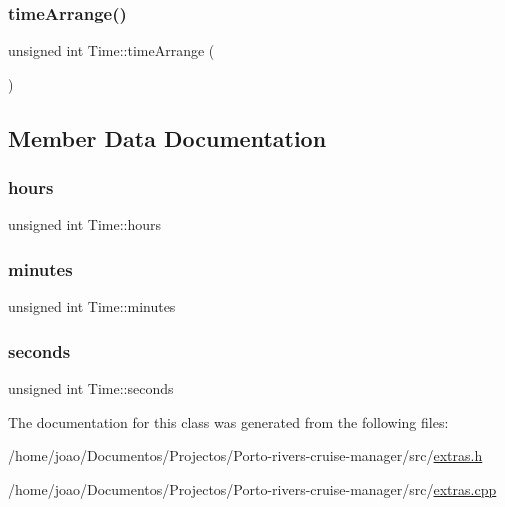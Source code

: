 \mbox{\label{classTime_a9cbc26fef4650c18e4f0c5ee695c006c}} 
\subsubsection{\texorpdfstring{time\+Arrange()}{timeArrange()}}
{\footnotesize\ttfamily unsigned int Time\+::time\+Arrange (\begin{DoxyParamCaption}{ }\end{DoxyParamCaption})\hspace{0.3cm}{\ttfamily [private]}}



\subsection{Member Data Documentation}
\mbox{\label{classTime_a08e7d6202b1fe8c01c25bf6688d41712}} 
\subsubsection{\texorpdfstring{hours}{hours}}
{\footnotesize\ttfamily unsigned int Time\+::hours\hspace{0.3cm}{\ttfamily [private]}}

\mbox{\label{classTime_ab9da5c3324d296464bf26131fd5d8c3f}} 
\subsubsection{\texorpdfstring{minutes}{minutes}}
{\footnotesize\ttfamily unsigned int Time\+::minutes\hspace{0.3cm}{\ttfamily [private]}}

\mbox{\label{classTime_ad39274f5d646ddc93addce23f8f71dde}} 
\subsubsection{\texorpdfstring{seconds}{seconds}}
{\footnotesize\ttfamily unsigned int Time\+::seconds\hspace{0.3cm}{\ttfamily [private]}}



The documentation for this class was generated from the following files\+:\begin{DoxyCompactItemize}
\item 
/home/joao/\+Documentos/\+Projectos/\+Porto-\/rivers-\/cruise-\/manager/src/\hyperlink{extras_8h}{extras.\+h}\item 
/home/joao/\+Documentos/\+Projectos/\+Porto-\/rivers-\/cruise-\/manager/src/\hyperlink{extras_8cpp}{extras.\+cpp}\end{DoxyCompactItemize}
